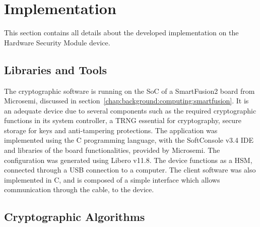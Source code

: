 \section{Implementation}\label{chap:implementation:app}

This section contains all details about the developed implementation on the Hardware Security Module device.

\subsection{Libraries and Tools}\label{chap:implementation:app:tools}

The cryptographic software is running on the \ac{SoC} of a SmartFusion2 board from Microsemi, discussed in section~\ref{chap:background:computing:smartfusion}. It is an adequate device due to several components such as the required cryptographic functions in its system controller, a \ac{TRNG} essential for cryptography, secure storage for keys and anti-tampering protections.
The application was implemented using the C programming language, with the SoftConsole v3.4 \ac{IDE} and libraries of the board functionalities, provided by Microsemi. The configuration was generated using Libero v11.8. The device functions as a \ac{HSM}, connected through a \ac{USB} connection to a computer.
The client software was also implemented in C, and is composed of a simple interface which allows communication through the cable, to the device.

\subsection{Cryptographic Algorithms}\label{chap:implementation:app:algorithms}

